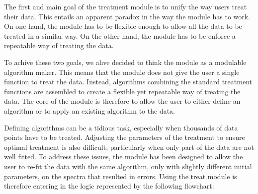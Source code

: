 The first and main goal of the treatment module is to unify the way users treat their data. This entails an apparent paradox in the way the module has to work. On one hand, the module has to be flexible enough to allow all the data to be treated in a similar way. On the other hand, the module has to be enforce a repeatable way of treating the data. 

To achive these two goals, we ahve decided to think the module as a modulable algorithm maker. This means that the module does not give the user a single function to treat the data. Instead, algorithms combining the standard treatment functions are assembled to create a flexible yet repeatable way of treating the data. The core of the module is therefore to allow the user to either define an algorithm or to apply an existing algorithm to the data.

Defining algorithms can be a tidious task, especially when thousands of data points have to be treated. Adjusting the parameters of the treatment to ensure optimal treatment is also difficult, particularly when only part of the data are not well fitted. To address these issues, the module has been designed to allow the user to re-fit the data with the same algorithm, only with slightly different initial parameters, on the spectra that resulted in errors. Using the treat module is therefore entering in the logic represented by the following flowchart:
\begin{figure}[H]
    \centering
    \label{fig:treatment.flowchart}
    \small
\end{figure}

